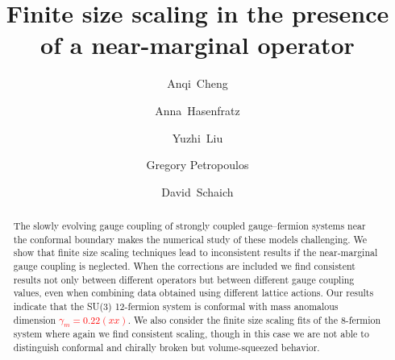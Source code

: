 \documentclass[prl, letterpaper, amsmath, amssymb, preprintnumbers, showpacs, superscriptaddress, twocolumn]{revtex4-1}
\newcommand{\ga}{\ensuremath{\gamma} }
\newcommand{\TODO}[1]{\textcolor{red}{{\bf #1}}}
\begin{document}
\title{Finite size scaling in the presence of a near-marginal operator}

\author{Anqi~Cheng}
\author{Anna~Hasenfratz}
\author{Yuzhi~Liu}
\author{Gregory Petropoulos}
\author{David~Schaich}

\begin{abstract} %
The slowly evolving gauge coupling of strongly coupled gauge--fermion systems near the conformal boundary makes the numerical study of these models challenging. We show that finite size scaling techniques lead to inconsistent results if the near-marginal gauge coupling is neglected. When the corrections are included we find consistent results not only between different operators but between different gauge coupling values, even when combining data obtained using different lattice actions. Our results indicate that the SU(3) 12-fermion system is conformal with mass anomalous dimension \TODO{$\ga_m = 0.22(xx)$}. We also consider the finite size scaling fits of the 8-fermion system where again we find consistent scaling, though in this case we are not able to distinguish conformal and chirally broken but volume-squeezed behavior.
\end{abstract}

\maketitle
\end{document}
